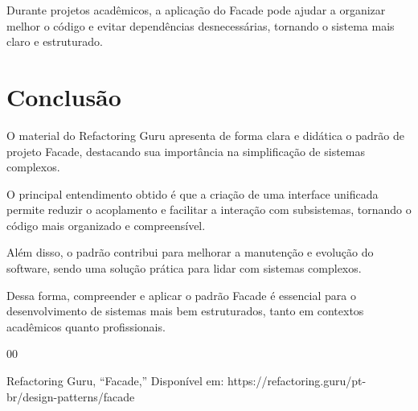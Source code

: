 \documentclass[conference]{IEEEtran}
\begin{document}
Durante projetos acadêmicos, a aplicação do Facade pode ajudar a organizar melhor o código e evitar dependências desnecessárias, tornando o sistema mais claro e estruturado.

\section{Conclusão}

O material do Refactoring Guru apresenta de forma clara e didática o padrão de projeto Facade, destacando sua importância na simplificação de sistemas complexos.

O principal entendimento obtido é que a criação de uma interface unificada permite reduzir o acoplamento e facilitar a interação com subsistemas, tornando o código mais organizado e compreensível.

Além disso, o padrão contribui para melhorar a manutenção e evolução do software, sendo uma solução prática para lidar com sistemas complexos.

Dessa forma, compreender e aplicar o padrão Facade é essencial para o desenvolvimento de sistemas mais bem estruturados, tanto em contextos acadêmicos quanto profissionais.

\begin{thebibliography}{00}

Refactoring Guru,
``Facade,''
Disponível em: https://refactoring.guru/pt-br/design-patterns/facade

\end{thebibliography}
\end{document}
